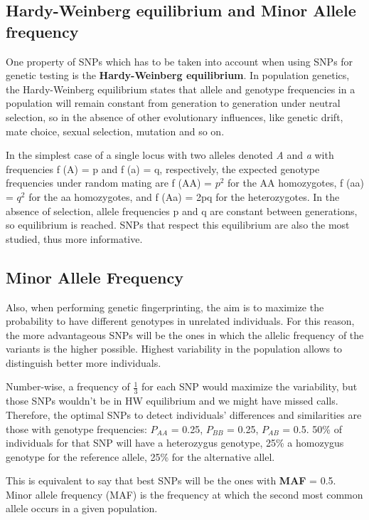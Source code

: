 \subsection*{Hardy-Weinberg equilibrium and Minor Allele frequency}

One property of SNPs which has to be taken into account when using SNPs for genetic testing is the \textbf{Hardy-Weinberg equilibrium}. 
In population genetics, the Hardy-Weinberg equilibrium states that allele and genotype frequencies in a population will remain constant from generation to generation under neutral selection, so in the absence of other evolutionary influences, like genetic drift, mate choice, sexual selection, mutation and so on.

In the simplest case of a single locus with two alleles denoted \emph{A} and \emph{a} with frequencies f (A) = p and f (a) = q, respectively, the expected genotype frequencies under random mating are f (AA) = $p^{2}$ for the AA homozygotes, f (aa) = $q^{2}$ for the aa homozygotes, and f (Aa) = 2pq for the heterozygotes. In the absence of selection, allele frequencies p and q are constant between generations, so equilibrium is reached.
SNPs that respect this equilibrium are also the most studied, thus more informative. 

\subsection*{Minor Allele Frequency}

Also, when performing genetic fingerprinting, the aim is to maximize the probability to have different genotypes in unrelated individuals. 
For this reason, the more advantageous SNPs will be the ones in which the allelic frequency of the variants is the higher possible. Highest variability in the population allows to distinguish better more individuals. 

Number-wise, a frequency of $\frac{1}{3}$ for each SNP would maximize the variability, but those SNPs wouldn't be in HW equilibrium and we might have missed calls. 
Therefore, the optimal SNPs to detect individuals’ differences and similarities are those with genotype frequencies: $P_{AA}$ = 0.25, $P_{BB}$ = 0.25, $P_{AB}$ = 0.5. 50\% of individuals for that SNP will have a heterozygus genotype, 25\% a homozygus genotype for the reference allele, 25\% for the alternative allel.

This is equivalent to say that best SNPs will be the ones with \textbf{MAF} = 0.5. Minor allele frequency (MAF) is the frequency at which the second most common allele occurs in a given population.

